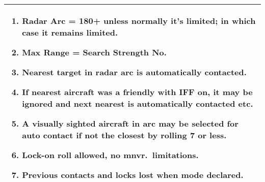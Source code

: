 \begin{onecolumntable}
\begin{tabularx}{\linewidth}{X}
\toprule
\begin{enumerate}
    \item Radar Arc = 180+ unless normally it's limited; in which case it remains limited.
    \item Max Range = Search Strength No.
    \item Nearest target in radar arc is automatically contacted.
    \item If nearest aircraft was a friendly with IFF on, it may be ignored and next nearest is automatically contacted etc.
    \item A visually sighted aircraft in arc may be selected for auto contact if not the closest by rolling 7 or less.
    \item Lock-on roll allowed, no mnvr.\ limitations.
    \item Previous contacts and locks lost when mode declared.
\end{enumerate}
\\
\bottomrule
\end{tabularx}
\end{onecolumntable}
